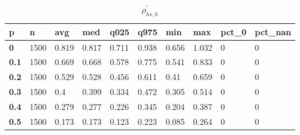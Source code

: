 \begin{table}[h]
 \centering 
\footnotesize
\caption{$\rho_{hs,h}^\prime $}
\label{tab:alphahsh}
\begin{tabular}[h]{|l|l|l|l|l|l|l|l|l|l|
    } \hline
\textbf{ p} & \textbf{ n} & \textbf{ avg} & \textbf{ med} & \textbf{ q025} & \textbf{ q975} & \textbf{ min} & \textbf{ max} & \textbf{ pct\_0} & \textbf{ pct\_nan}
    \\ \hline
  \textbf{  0} & 1500 & 0.819 & 0.817 & 0.711 & 0.938 & 0.656 & 1.032 & 0 & 0
    \\ \hline
  \textbf{0.1} & 1500 & 0.669 & 0.668 & 0.578 & 0.775 & 0.541 & 0.833 & 0 & 0
    \\ \hline
  \textbf{0.2} & 1500 & 0.529 & 0.528 & 0.456 & 0.611 &  0.41 & 0.659 & 0 & 0
    \\ \hline
  \textbf{0.3} & 1500 &   0.4 & 0.399 & 0.334 & 0.472 & 0.305 & 0.514 & 0 & 0
    \\ \hline
  \textbf{0.4} & 1500 & 0.279 & 0.277 & 0.226 & 0.345 & 0.204 & 0.387 & 0 & 0
    \\ \hline
  \textbf{0.5} & 1500 & 0.173 & 0.173 & 0.123 & 0.223 & 0.085 & 0.264 & 0 & 0
    \\ \hline
 \end{tabular}
 \end{table}
